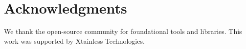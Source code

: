 \documentclass[conference]{IEEEtran}
\begin{document}
\section*{Acknowledgments}

We thank the open-source community for foundational tools and libraries. This work was supported by Xtainless Technologies.




\end{document}
